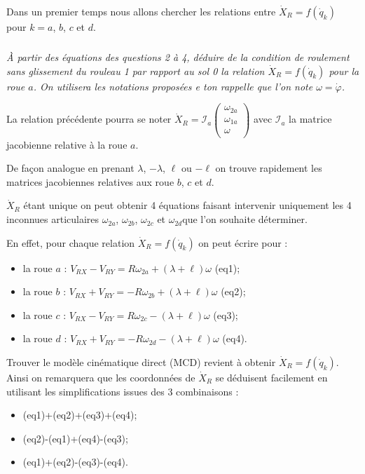 Dans un premier temps nous allons chercher les relations entre $\dot{X}_R = f\left(\dot{q}_k \right)$ pour 
$k=a$, $b$, $c$ et $d$.

\subparagraph{}
\textit{À partir des équations des questions 2 à 4, déduire de la condition de roulement sans glissement du rouleau 1 par rapport au sol 0 la relation $\dot{X}_R = f\left(\dot{q}_k \right)$  pour la roue $a$. On utilisera les notations proposées e ton rappelle que l'on note $\omega=\dot{\varphi}$.}
\ifprof%
\begin{corrige}
\end{corrige}\else\fi

La relation précédente pourra se noter $\dot{X}_R = \mathcal{I}_a \begin{pmatrix}
\omega_{2a} \\ \omega_{1a}\\ \omega_{}\end{pmatrix}$ avec $\mathcal{I}_a$ la matrice jacobienne relative à la roue $a$.

De façon analogue en prenant $\lambda$, $-\lambda$, $\ell$ ou $-\ell$ on trouve rapidement les matrices jacobiennes relatives aux roue $b$, $c$ et $d$.

$\dot{X}_R$ étant unique on peut obtenir 4 équations faisant intervenir uniquement les 4 inconnues articulaires $\omega_{2a}$, $\omega_{2b}$, $\omega_{2c}$ et $\omega_{2d}$que l'on souhaite déterminer.

En effet, pour chaque relation $\dot{X}_R = f\left(\dot{q}_k \right)$ on peut écrire pour :
\begin{itemize}
\item la roue $a$ : $V_{RX}-V_{RY}=R\omega_{2a}+\left(\lambda+\ell\right)\omega$ (eq1);
\item la roue $b$ : $V_{RX}+V_{RY}=-R\omega_{2b}+\left(\lambda+\ell\right)\omega$ (eq2);
\item la roue $c$ : $V_{RX}-V_{RY}=R\omega_{2c}-\left(\lambda+\ell\right)\omega$ (eq3);
\item la roue $d$ : $V_{RX}+V_{RY}=-R\omega_{2d}-\left(\lambda+\ell\right)\omega$ (eq4).
\end{itemize}

Trouver le modèle cinématique direct (MCD) revient à obtenir $\dot{X}_R = f\left(\dot{q}_k \right)$. Ainsi on remarquera que les coordonnées de $\dot{X}_R$ se déduisent facilement en utilisant les simplifications issues des 3 combinaisons :
\begin{itemize}
 \item (eq1)+(eq2)+(eq3)+(eq4);
 \item (eq2)-(eq1)+(eq4)-(eq3);
 \item (eq1)+(eq2)-(eq3)-(eq4).
\end{itemize}



